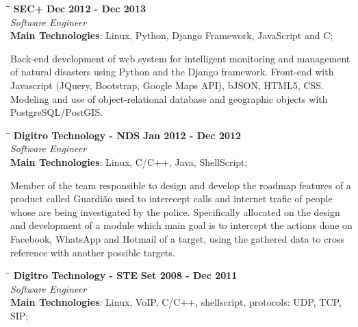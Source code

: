 \documentclass[margin]{res}
\begin{document}
\begin{resume}
\vspace{-0.1in}
   \begin{tabbing}
   \hspace{2.3in}\= \hspace{1.7in}\= \kill %
    \textbf{SEC+}    \>\>\textbf{Dec 2012 - Dec 2013}\\
    \textit{Software Engineer}\\        
    \textbf{Main Technologies}: Linux, Python, Django Framework, JavaScript and C;
   \end{tabbing}\vspace{-20pt}      %
    \vspace{2mm}
     Back-end development of web system for intelligent monitoring and management of natural disasters using Python and the Django framework. Front-end with Javascript (JQuery, Bootstrap, Google Maps API), bJSON, HTML5, CSS. Modeling and use of object-relational database and geographic objects with PostgreSQL/PostGIS.

\vspace{-0.1in}
   \begin{tabbing}
   \hspace{2.3in}\= \hspace{1.7in}\= \kill %
    \textbf{Digitro Technology - NDS}    \>\>\textbf{Jan 2012 - Dec 2012}\\
    \textit{Software Engineer}\\   
    \textbf{Main Technologies}: Linux, C/C++, Java, ShellScript;
   \end{tabbing}\vspace{-20pt}      %
    \vspace{2mm}
    Member of the team responsible to design and develop the roadmap features of a product called
    Guardião used to interecept calls and internet trafic of people whose are being investigated by the police. Specifically allocated on the design and development of a module which main goal is to intercept the actions done on Facebook, WhatsApp and Hotmail of a target, using the gathered data to cross reference with another possible targets.

\vspace{-0.1in}   
   \begin{tabbing}
   \hspace{2.3in}\= \hspace{1.7in}\= \kill %
    \textbf{Digitro Technology - STE}    \>\>\textbf{Set 2008 - Dec 2011}\\
    \textit{Software Engineer}\\   
    \textbf{Main Technologies}: Linux, VoIP, C/C++, shellscript, protocols: UDP, TCP, SIP;
   \end{tabbing}\vspace{-20pt}      %
    \vspace{2mm}
    

\end{resume}
\end{document}
